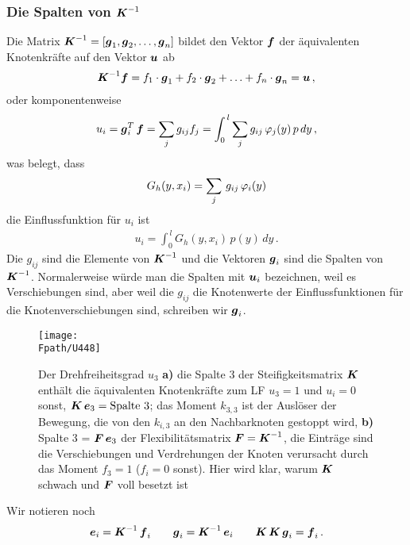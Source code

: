 {{\textcolor{sectionTitleBlue}{\subsubsection*{Die Spalten von $\mbox{\boldmath $K$}^{-1}$}}}
Die Matrix $\mbox{\boldmath $K$}^{-1} = [\mbox{\boldmath $g$}_1, \mbox{\boldmath $g$}_2, \ldots, \mbox{\boldmath $g$}_n]$ bildet den Vektor $\mbox{\boldmath $f$}$ der \"{a}quivalenten Knotenkr\"{a}fte auf den Vektor $\mbox{\boldmath $u$}$ ab
\begin{align}
\mbox{\boldmath $K$}^{-1} \mbox{\boldmath $f$} = f_1 \cdot \mbox{\boldmath $g$}_1 + f_2 \cdot \mbox{\boldmath $g$}_2 + \ldots + f_n \cdot \mbox{\boldmath $g$}_n = \mbox{\boldmath $u$}\,,
\end{align}
oder komponentenweise
\begin{align}
u_i = \mbox{\boldmath $g$}_i^T\,\mbox{\boldmath $f$} = \sum_j g_{ij} f_j  = \int_0^{\,l} \sum_j g_{ij}  \,\varphi_j(y)\,p\,dy\,,
\end{align}
was belegt, dass
\begin{align}
G_h(y,x_i)= \sum_j\, g_{ij} \,\varphi_i(y)
\end{align}
die Einflussfunktion f\"{u}r $u_i$ ist
\begin{align}
u_i = \int_0^{\,l} G_h(y,x_i)\,p(y)\,dy\,.
\end{align}
Die $g_{ij}$ sind die Elemente von $\mbox{\boldmath $K$}^{-1}$ und die Vektoren $\mbox{\boldmath $g$}_i$ sind die Spalten von $\mbox{\boldmath $K$}^{-1}$. Normalerweise w\"{u}rde man die Spalten mit $\mbox{\boldmath $u$}_i$ bezeichnen, weil es Verschiebungen sind, aber weil die $g_{ij}$ die Knotenwerte der Einflussfunktionen f\"{u}r die Knotenverschiebungen sind,  schreiben wir $\mbox{\boldmath $g$}_i$.
\begin{figure}
\centering
\if {} \sidecaption \fi
\texttt{[image: \\Fpath/U448]}
\caption{Der Drehfreiheitsgrad $u_{3}$ \textbf{ a)} die Spalte 3 der Steifigkeitsmatrix $\mbox{\boldmath $K$}$ enth\"{a}lt die \"{a}quivalenten Knotenkr\"{a}fte zum LF $u_{3} = 1$ und $u_i = 0$ sonst, $\mbox{\boldmath $K$}\,\mbox{\boldmath $e$}_{3} = \text{Spalte 3}$; das Moment $k_{3,3}$ ist der Ausl\"{o}ser der Bewegung, die von den $k_{i,3}$ an den Nachbarknoten gestoppt wird, \textbf{ b)} Spalte 3 = $\mbox{\boldmath $F$}\,\mbox{\boldmath $e$}_{3}$ der Flexibilit\"{a}tsmatrix $\mbox{\boldmath $F$} = \mbox{\boldmath $K$}^{-1}$, die Eintr\"{a}ge sind die Verschiebungen und Verdrehungen der Knoten verursacht durch das Moment $f_{3} = 1$ ($f_i = 0$ sonst). Hier wird klar, warum $\mbox{\boldmath $K$}$ schwach und $\mbox{\boldmath $F$}$ voll besetzt ist }
\label{U448}%
\end{figure}%
Wir notieren noch
\begin{align}
\mbox{\boldmath $e$}_i = \mbox{\boldmath $K$}^{-1}\,\mbox{\boldmath $f$}_i \qquad \mbox{\boldmath $g$}_i = \mbox{\boldmath $K$}^{-1}\,\mbox{\boldmath $e$}_i \qquad \mbox{\boldmath $K$}\,\mbox{\boldmath $K$}\,\mbox{\boldmath $g$}_i = \mbox{\boldmath $f$}_i\,.
\end{align}

}
